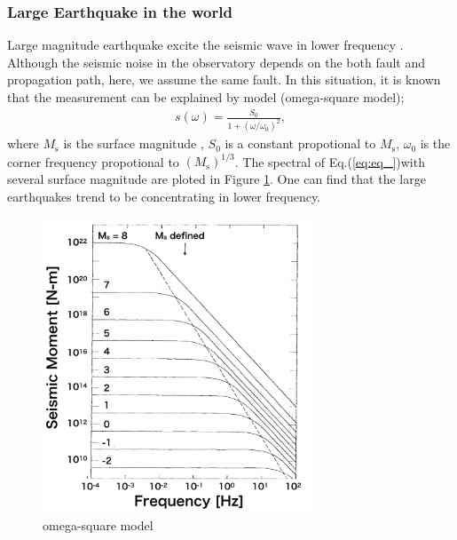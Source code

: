 \subsubsection{Large Earthquake in the world}
Large magnitude earthquake excite the seismic wave in lower frequency \cite{aki2002quantitative,aki1967scaling}. Although the seismic noise in the observatory depends on the both fault and propagation path, here, we assume the same fault. In this situation, it is known that the measurement can be explained by model (omega-square model);
\begin{eqnarray}
  s(\omega) = \displaystyle\frac{S_0}{1+({\omega}/{\omega_0})^2}, \label{eq:eq_}
\end{eqnarray}
where $M_{\mathrm{s}}$ is the surface magnitude \cite{gutenberg1945study}, $S_0$ is a constant propotional to $M_{\mathrm{s}}$, $\omega_0$ is the corner frequency propotional to $(M_{\mathrm{s}})^{1/3}$. The spectral of Eq.(\ref{eq:eq_})with several surface magnitude are ploted in Figure \ref{img:img328}. One can find that the large earthquakes trend to be concentrating in lower frequency.

\begin{figure}[h]
  \begin{center}   
    \includegraphics[width=8cm]{./img_chap3/img328.png}
    \caption{omega-square model \cite{aki1967scaling}}\label{img:img328}
  \end{center}
\end{figure}


\newpage
